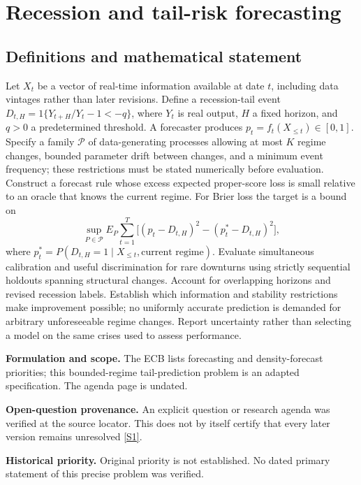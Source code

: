 \documentclass[11pt]{article}
\newcommand{\sref}[2]{\hyperlink{source:#1:#2}{[S#2]}}
\begin{document}
\section*{Recession and tail-risk forecasting}\label{30007520}
\subsection{Definitions and mathematical statement}
Let \(X_t\) be a vector of real-time information available at date \(t\), including data vintages rather than later revisions. Define a recession-tail event \(D_{t,H}=1\{Y_{t+H}/Y_t-1<-q\}\), where \(Y_t\) is real output, \(H\) a fixed horizon, and \(q>0\) a predetermined threshold. A forecaster produces \(p_t=f_t(X_{\le t})\in[0,1]\). Specify a family \(\mathcal P\) of data-generating processes allowing at most \(K\) regime changes, bounded parameter drift between changes, and a minimum event frequency; these restrictions must be stated numerically before evaluation.
Construct a forecast rule whose excess expected proper-score loss is small relative to an oracle that knows the current regime. For Brier loss the target is a bound on
\[
\sup_{P\in\mathcal P}E_P\sum_{t=1}^T
\big[(p_t-D_{t,H})^2-(p_t^*-D_{t,H})^2\big],
\]
where \(p_t^*=P(D_{t,H}=1\mid X_{\le t},\text{current regime})\).
Evaluate simultaneous calibration and useful discrimination for rare downturns using strictly sequential holdouts spanning structural changes. Account for overlapping horizons and revised recession labels. Establish which information and stability restrictions make improvement possible; no uniformly accurate prediction is demanded for arbitrary unforeseeable regime changes. Report uncertainty rather than selecting a model on the same crises used to assess performance.

\par\textbf{Formulation and scope.} The ECB lists forecasting and density-forecast priorities; this bounded-regime tail-prediction problem is an adapted specification. The agenda page is undated.

\par\textbf{Open-question provenance.} An explicit question or research agenda was verified at the source locator. This does not by itself certify that every later version remains unresolved \sref{30007520}{1}.

\par\textbf{Historical priority.} Original priority is not established. No dated primary statement of this precise problem was verified.
\end{document}
